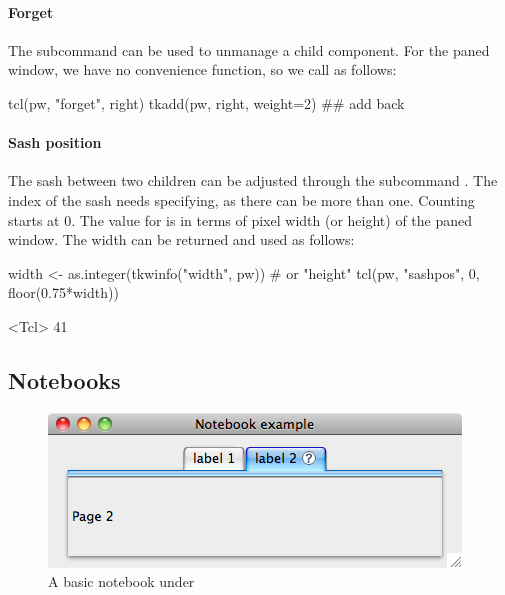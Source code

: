 \paragraph{Forget}
The subcommand  can be used to
unmanage a child component. For the paned window, we have no
convenience function, so we call as follows:
\begin{Schunk}
\begin{Sinput}
 tcl(pw, "forget", right)
 tkadd(pw, right, weight=2) ## add back
\end{Sinput}
\end{Schunk}
%
\paragraph{Sash position}
The sash between two children can be adjusted through the subcommand
. The index of the sash needs
specifying, as there can be more than one. Counting starts at 0. The
value for  is in terms of pixel width (or height) of the
paned window. The width can be returned and used as follows:
\begin{Schunk}
\begin{Sinput}
 width <- as.integer(tkwinfo("width", pw))  # or "height"
 tcl(pw, "sashpos", 0, floor(0.75*width))
\end{Sinput}
\begin{Soutput}
<Tcl> 41 
\end{Soutput}
\end{Schunk}
%

\subsection{Notebooks}
\label{sec:tcltk:notebooks}


%
\begin{figure}
  \centering
  \includegraphics[width=.6\textwidth]{fig-tcltk-notebook}
 \caption{A basic notebook under \OSX{}}
  \label{fig:fig-notebook-example}
\end{figure}

